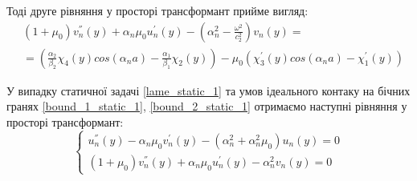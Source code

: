 Тоді друге рівняння у просторі трансформант прийме вигляд:
\begin{align*}
    &(1 + \mu_0) v_n^{''}(y) + \alpha_n \mu_0 u_n^{'}(y)  - (\alpha_n^2 -  \frac{\omega^2}{c_2^2}) v_n(y) = \\ 
    &= (\frac{\alpha_2}{\beta_2}\chi_4(y) cos(\alpha_n a) - \frac{\alpha_1}{\beta_1}\chi_2(y)) - \mu_0 (\chi_3^{'}(y) cos(\alpha_n a) -\chi_1^{'}(y))
\end{align*}

У випадку статичної задачі \eqref{lame_static_1} та умов ідеального контаку на бічних гранях \eqref{bound_1_static_1}, \eqref{bound_2_static_1}
отримаємо наступні рівняння у просторі трансформант:
\begin{equation*}
    \begin{cases}
        u_n^{''}(y) - \alpha_n \mu_0 v_n^{'}(y) -(\alpha_n^2 + \alpha_n^2 \mu_0) u_n(y) = 0 \\
        (1 + \mu_0) v_n^{''}(y) + \alpha_n \mu_0 u_n^{'}(y)  - \alpha_n^2 v_n(y) = 0
    \end{cases}
\end{equation*}

